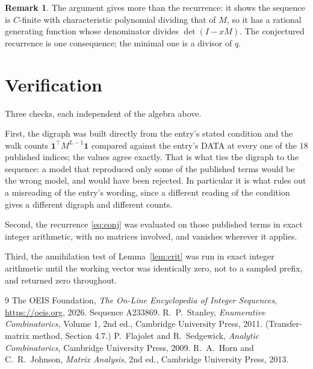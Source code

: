 \documentclass[11pt,a4paper]{article}
\theoremstyle{plain}
\theoremstyle{definition}
\newtheorem{remark}[theorem]{Remark}
\begin{document}
\begin{remark}
The argument gives more than the recurrence: it shows the sequence is $C$-finite with
characteristic polynomial dividing that of $M$, so it has a rational generating function
whose denominator divides $\det(I-xM)$. The conjectured recurrence is one consequence; the
minimal one is a divisor of $q$.
\end{remark}

\section{Verification}

Three checks, each independent of the algebra above.

First, the digraph was built directly from the entry's stated condition and the walk counts
$\mathbf{1}^{\!\top}M^{L-1}\mathbf{1}$ compared against the entry's DATA at
every one of the $18$ published indices; the values agree exactly. That is what ties
the digraph to the sequence: a model that reproduced only some of the published terms would
be the wrong model, and would have been rejected. In particular it is what rules out a
misreading of the entry's wording, since a different reading of the condition gives a
different digraph and different counts.

Second, the recurrence \eqref{eq:conj} was evaluated on those published terms in exact
integer arithmetic, with no matrices involved, and vanishes wherever it applies.

Third, the annihilation test of Lemma~\ref{lem:crit} was run in exact integer arithmetic
until the working vector was identically zero, not to a sampled prefix, and returned zero
throughout.

\begin{thebibliography}{9}
 The OEIS Foundation, \emph{The On-Line Encyclopedia of Integer
Sequences}, \url{https://oeis.org}, 2026. Sequence A233869.
 R.~P.~Stanley, \emph{Enumerative Combinatorics}, Volume 1, 2nd ed.,
Cambridge University Press, 2011. (Transfer-matrix method, Section 4.7.)
 P.~Flajolet and R.~Sedgewick, \emph{Analytic Combinatorics}, Cambridge
University Press, 2009.
 R.~A.~Horn and C.~R.~Johnson, \emph{Matrix Analysis}, 2nd ed., Cambridge
University Press, 2013.
\end{thebibliography}
\end{document}
